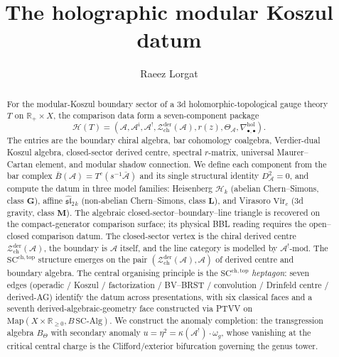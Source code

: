 \documentclass[11pt,reqno]{amsart}
\theoremstyle{definition}
\theoremstyle{remark}
\newcommand{\cA}{\mathcal{A}}
\newcommand{\cH}{\mathcal{H}}
\newcommand{\cZ}{\mathcal{Z}}
\newcommand{\Vir}{\mathrm{Vir}}
\newcommand{\SCchtop}{\mathrm{SC}^{\mathrm{ch,top}}}
\newcommand{\barB}{\bar{B}}
\newcommand{\hol}{\mathrm{hol}}
\newcommand{\fsl}{\mathfrak{sl}}
\newcommand{\bR}{\mathbb{R}}
\numberwithin{equation}{section}
\begin{document}
\title{The holographic modular Koszul datum}

\author{Raeez Lorgat}
\date{}

\begin{abstract}
For the modular-Koszul boundary sector of a 3d
holomorphic-topological gauge theory $T$ on $\bR_+ \times X$, the
comparison data form a seven-component package
\[
\cH(T)=(\cA,\cA^{\mathrm{i}},\cA^!,
\cZ^{\mathrm{der}}_{\mathrm{ch}}(\cA),r(z),\Theta_{\cA},
\nabla^{\hol}_{\bullet,\bullet}).
\]
The entries are the boundary chiral algebra, bar cohomology coalgebra,
Verdier-dual Koszul algebra, closed-sector derived centre, spectral
$r$-matrix, universal Maurer--Cartan element, and modular shadow
connection. We define each component from the bar complex
$\barB(\cA) = T^c(s^{-1}\bar{\cA})$ and its single
structural identity $D_{\cA}^2 = 0$, and compute the datum in
three model families: Heisenberg $\cH_k$ (abelian
Chern--Simons, class $\mathbf{G}$), affine
$\widehat{\fsl}_2{}_k$ (non-abelian Chern--Simons, class
$\mathbf{L}$), and Virasoro $\Vir_c$ (3d gravity, class
$\mathbf{M}$). The algebraic closed-sector--boundary--line triangle is
recovered on the compact-generator comparison surface; its physical
BBL reading requires the open--closed comparison datum. The
closed-sector vertex is the chiral derived centre
$\cZ^{\mathrm{der}}_{\mathrm{ch}}(\cA)$, the boundary is
$\cA$ itself, and the line category is modelled by
$\cA^!\text{-mod}$. The
$\SCchtop$ structure emerges on the pair
$(\cZ^{\mathrm{der}}_{\mathrm{ch}}(\cA), \cA)$ of derived centre
and boundary algebra. The central
organising principle is the $\SCchtop$ \emph{heptagon}: seven edges
(operadic / Koszul / factorization / BV--BRST / convolution / Drinfeld
centre / derived-AG) identify the datum across presentations, with
six classical faces and a seventh derived-algebraic-geometry face
constructed via PTVV on $\mathrm{Map}(X \times \bR_{\geq 0},
B\,\mathrm{SC\text{-}Alg})$. We construct the
anomaly completion: the transgression algebra $B_\Theta$ with
secondary anomaly $u = \eta^2 = \kappa(\cA^!) \cdot \omega_g$,
whose vanishing at the critical central charge is the
Clifford/exterior bifurcation governing the genus tower.
\end{abstract}
\end{document}
